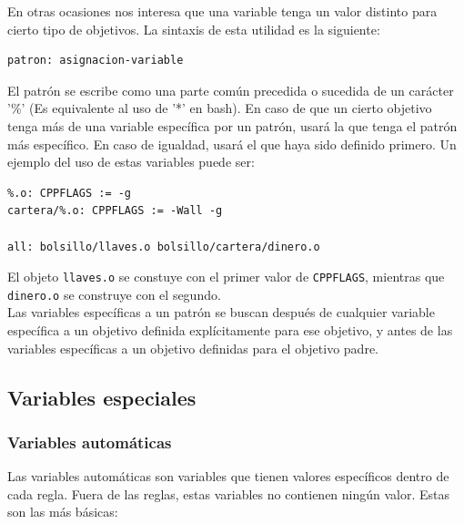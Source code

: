 \documentclass[11pt,twoside,titlepage,a4paper]{article}
\theoremstyle{definition}
\theoremstyle{plain_rojo}
\theoremstyle{remark}
\begin{document}
En otras ocasiones nos interesa que una variable tenga un valor distinto para 
cierto tipo de objetivos. La sintaxis de esta utilidad es la siguiente:
\bigskip
\begin{lstlisting}
patron: asignacion-variable
\end{lstlisting}
\bigskip
El patrón se escribe como una parte común precedida o sucedida de un carácter 
'\%' (Es equivalente al uso de '*' en bash). En caso de que un cierto 
objetivo tenga más de una variable específica por un patrón, usará la que 
tenga el patrón más específico. En caso de igualdad, usará el que haya sido 
definido primero. Un ejemplo del uso de estas variables puede ser:
\bigskip
\begin{lstlisting}
%.o: CPPFLAGS := -g
cartera/%.o: CPPFLAGS := -Wall -g

all: bolsillo/llaves.o bolsillo/cartera/dinero.o
\end{lstlisting}
\bigskip
El objeto \texttt{llaves.o} se constuye con el primer valor de 
\texttt{CPPFLAGS}, mientras que \texttt{dinero.o} se construye con el segundo.
\\

Las variables específicas a un patrón se buscan después de cualquier variable 
específica a un objetivo definida explícitamente para ese objetivo, y antes 
de las variables específicas a un objetivo definidas para el objetivo padre.

\subsection{Variables especiales}

\subsubsection{Variables automáticas}

Las variables automáticas son variables que tienen valores específicos dentro 
de cada regla. Fuera de las reglas, estas variables no contienen ningún 
valor. Estas son las más básicas:
\end{document}
